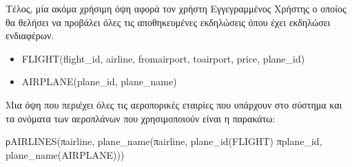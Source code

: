 Τέλος, μία ακόμα χρήσιμη όψη αφορά τον χρήστη Εγγεγραμμένος Χρήστης ο
οποίος θα θελήσει να προβάλει όλες τις αποθηκευμένες εκδηλώσεις όπου
έχει εκδηλώσει ενδιαφέρων.



\begin{itemize}[noitemsep]
\item FLIGHT(flight\_id, airline, fromairport, toairport, price,
  plane\_id)
\item AIRPLANE(plane\_id, plane\_name) 
\end{itemize}

Μια όψη που περιέχει όλες τις αεροπορικές εταιρίες που υπάρχουν στο
σύστημα και τα ονόματα των αεροπλάνων που χρησιμοποιούν είναι η
παρακάτω:

ρAIRLINES(πairline, plane\_name(πairline, plane\_id(FLIGHT)
πplane\_id, plane\_name(AIRPLANE)))



